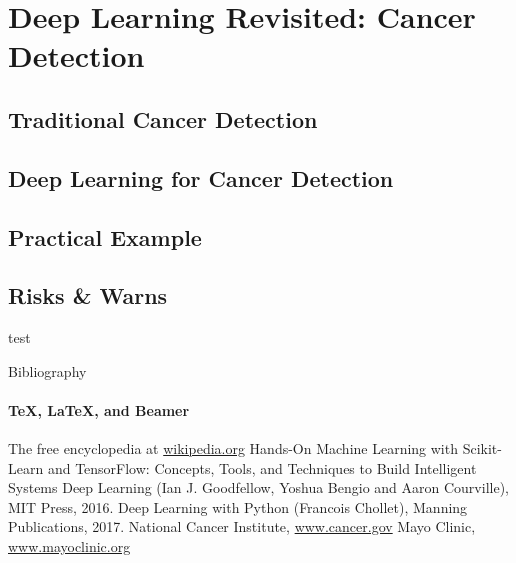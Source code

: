 \documentclass{beamer}
\begin{document}
    \section{Deep Learning Revisited: Cancer Detection}
    \subsection{Traditional Cancer Detection}
    \subsection{Deep Learning for Cancer Detection}
    \subsection{Practical Example}
    \subsection{Risks \& Warns}
    \begin{frame}
      test
    \end{frame}

\begin{frame}[label=bibliography]{Bibliography}
  \framesubtitle{\TeX, \LaTeX, and Beamer}
  \begin{thebibliography}{9}
    The free encyclopedia at
    \href{https://wikipedia.org}{wikipedia.org}
    Hands-On Machine Learning with Scikit-Learn and TensorFlow: Concepts, Tools, and Techniques to Build Intelligent Systems
    Deep Learning (Ian J. Goodfellow, Yoshua Bengio and Aaron Courville), MIT Press, 2016.
    Deep Learning with Python (Francois Chollet), Manning Publications, 2017.
    National Cancer Institute, \href{https://www.cancer.gov}{www.cancer.gov}
    Mayo Clinic, \href{https://www.mayoclinic.org}{www.mayoclinic.org}
  \end{thebibliography}
\end{frame}
\end{document}
